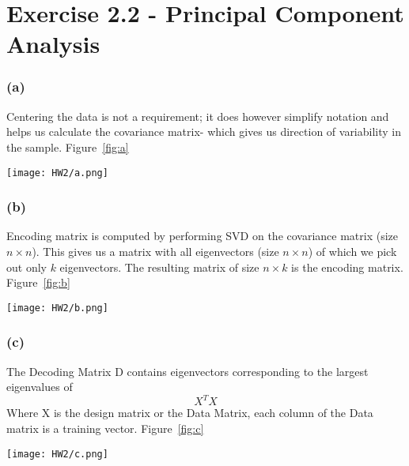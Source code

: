 \documentclass{article}[a4paper]
\begin{document}
\section*{Exercise 2.2 - Principal Component Analysis}
\subsubsection*{(a)}

Centering the data is not a requirement; it does however simplify notation and helps us calculate the covariance matrix- which gives us direction of variability in the sample. Figure~\ref{fig:a}
\begin{figure*}[ht]
  \centering
  \texttt{[image: HW2/a.png]}
  \caption{\textit{Centered dataset with all principle components marked}}
  \label{fig:a}
\end{figure*}

\subsubsection*{(b)}

Encoding matrix is computed by performing SVD on the covariance matrix (size $n \times n$). This gives us a matrix with all eigenvectors (size $n \times n$) of which we pick out only $k$ eigenvectors. The resulting matrix of size $n \times k$ is the encoding matrix.
Figure~\ref{fig:b}
\begin{figure*}[ht]
  \centering
  \texttt{[image: HW2/b.png]}
  \caption{\textit{1-D data after encoding}}
  \label{fig:b}
\end{figure*}
\clearpage
\subsubsection*{(c)}
The Decoding Matrix D  contains eigenvectors corresponding to the largest eigenvalues of \[ X^{T}X\]
Where X is the design matrix or the Data Matrix, each column of the Data matrix is a training vector. 
Figure~\ref{fig:c}
\begin{figure*}[ht]
  \centering
  \texttt{[image: HW2/c.png]}
  \caption{\textit{Data in original space after decoding}}
  \label{fig:c}
\end{figure*}
\end{document}
